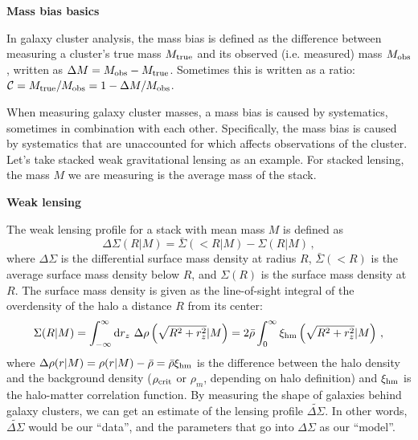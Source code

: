 \documentclass[12pt]{article}
\newcommand{\wds}{\widetilde{\Delta\Sigma}}
\newcommand{\ds}{\Delta\Sigma}
\begin{document}
\noindent
{\bf Mass bias basics}

In galaxy cluster analysis, the mass bias is defined as the difference between measuring a cluster's true mass $M_{\rm true}$ and its observed (i.e. measured) mass $M_{\rm obs}$, written as $\Delta M = M_{\rm obs}-M_{\rm true}$. Sometimes this is written as a ratio: $\mathcal{C} = M_{\rm true}/M_{\rm obs} = 1-\Delta M/M_{\rm obs}$.

When measuring galaxy cluster masses, a mass bias is caused by systematics, sometimes in combination with each other. Specifically, the mass bias is caused by systematics that are unaccounted for which affects observations of the cluster. Let's take stacked weak gravitational lensing as an example. For stacked lensing, the mass $M$ we are measuring is the average mass of the stack.

\vspace{12pt}
\noindent
{\bf Weak lensing}

The weak lensing profile for a stack with mean mass $M$ is defined as 
%
\begin{equation}
	\label{eq:deltasigma_def}
	\Delta\Sigma(R|M) = \bar{\Sigma}(<R|M) - \Sigma(R|M)\,,
\end{equation}
%
where $\Delta\Sigma$ is the differential surface mass density at radius $R$, $\bar{\Sigma}(<R)$ is the average surface mass density below $R$, and $\Sigma(R)$ is the surface mass density at $R$. The surface mass density is given as the line-of-sight integral of the overdensity of the halo a distance $R$ from its center:
%
\begin{equation}
	\label{eq:sigma_def}
	\Sigma(R|M) = \int_{-\infty}^{\infty} {\rm d}r_z\ \Delta\rho\left(\sqrt{R^2+r_z^2}|M\right) = 2\bar{\rho}\int_0^\infty \xi_{\rm hm}\left(\sqrt{R^2+r_z^2}|M\right)\,,
\end{equation}
%
where $\Delta\rho(r|M) = \rho(r|M) - \bar{\rho} = \bar{\rho}\xi_{\rm hm}$ is the difference between the halo density and the background density ($\rho_{\rm crit}$ or $\rho_{m}$, depending on halo definition) and $\xi_{\rm hm}$ is the halo-matter correlation function. By measuring the shape of galaxies behind galaxy clusters, we can get an estimate of the lensing profile $\wds$. In other words, $\wds$ would be our ``data'', and the parameters that go into $\ds$ as our ``model''.
\end{document}
